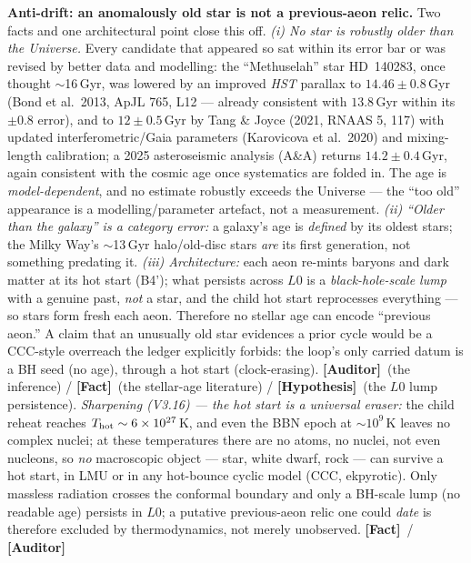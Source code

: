 \documentclass[11pt]{article}
\newcommand{\Fact}{\textbf{\textcolor{green!45!black}{[Fact]}}}
\newcommand{\Hyp}{\textbf{\textcolor{blue!55!black}{[Hypothesis]}}}
\newcommand{\Auditor}{\textbf{\textcolor{teal!55!black}{[Auditor]}}}
\begin{document}
\textbf{Anti-drift: an anomalously old star is not a previous-aeon relic.} Two facts and one architectural point close this off. \emph{(i) No star is \emph{robustly} older than the Universe.} Every candidate that appeared so sat within its error bar or was revised by better data and modelling: the ``Methuselah'' star HD~140283, once thought $\sim$16\,Gyr, was lowered by an improved \emph{HST} parallax to $14.46\pm0.8$\,Gyr (Bond et al.\ 2013, ApJL 765, L12 --- already consistent with $13.8$\,Gyr within its $\pm0.8$ error), and to $12\pm0.5$\,Gyr by Tang \& Joyce (2021, RNAAS 5, 117) with updated interferometric/Gaia parameters (Karovicova et al.\ 2020) and mixing-length calibration; a 2025 asteroseismic analysis (A\&A) returns $14.2\pm0.4$\,Gyr, again consistent with the cosmic age once systematics are folded in. The age is \emph{model-dependent}, and no estimate robustly exceeds the Universe --- the ``too old'' appearance is a modelling/parameter artefact, not a measurement. \emph{(ii) ``Older than the galaxy'' is a category error:} a galaxy's age is \emph{defined} by its oldest stars; the Milky Way's $\sim$13\,Gyr halo/old-disc stars \emph{are} its first generation, not something predating it. \emph{(iii) Architecture:} each aeon re-mints baryons and dark matter at its hot start (B4'); what persists across $L0$ is a \emph{black-hole-scale lump} with a genuine past, \emph{not} a star, and the child hot start reprocesses everything --- so stars form fresh each aeon. Therefore no stellar age can encode ``previous aeon.'' A claim that an unusually old star evidences a prior cycle would be a CCC-style overreach the ledger explicitly forbids: the loop's only carried datum is a BH seed (no age), through a hot start (clock-erasing). \Auditor\ (the inference) / \Fact\ (the stellar-age literature) / \Hyp\ (the $L0$ lump persistence). \emph{Sharpening (V3.16) --- the hot start is a universal eraser:} the child reheat reaches $T_{\rm hot}\sim6\times10^{27}$\,K, and even the BBN epoch at $\sim10^{9}$\,K leaves no complex nuclei; at these temperatures there are no atoms, no nuclei, not even nucleons, so \emph{no} macroscopic object --- star, white dwarf, rock --- can survive a hot start, in LMU or in any hot-bounce cyclic model (CCC, ekpyrotic). Only massless radiation crosses the conformal boundary and only a BH-scale lump (no readable age) persists in $L0$; a putative previous-aeon relic one could \emph{date} is therefore excluded by thermodynamics, not merely unobserved. \Fact\ / \Auditor
\end{document}
